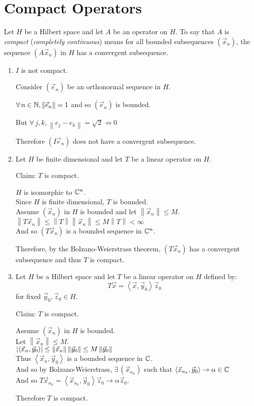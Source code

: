 \documentclass[letterpaper,12pt,fleqn]{article}
\newcommand{\ve}{\vec{e}}
\newcommand{\vx}{\vec{x}}
\newcommand{\vy}{\vec{y}}
\newcommand{\vz}{\vec{z}}
\newcommand{\norm}[1]{\left\|#1\right\|}
\newcommand{\inner}[1]{\left<#1\right>}
\renewcommand{\a}{\alpha}
\begin{document}
\section*{Compact Operators}

\begin{definition}
  Let $H$ be a Hilbert space and let $A$ be an operator on $H$. To say that
  $A$ is \emph{compact} (\emph{completely continuous}) means for all bounded
  subsequences $(\vx_n)$, the sequence $(A\vx_n)$ in $H$ has a convergent
  subsequence.
\end{definition}

\begin{examples}
  \listbreak
  \begin{enumerate}
  \item $I$ is not compact.

    Consider $(\ve_n)$ be an orthonormal sequence in $H$.

    $\forall\,n\in\N,\norm{\ve_n}=1$ and so $(\ve_n)$ is bounded.

    But $\forall\,j,k,\norm{e_j-e_k}=\sqrt{2}\not\to0$

    Therefore $(I\ve_n)$ does not have a convergent subsequence.

  \item Let $H$ be finite dimensional and let $T$ be a linear operator on $H$.

    Claim: $T$ is compact.

    $H$ is isomorphic to $\mathbb{C}^n$. \\
    Since $H$ is finite dimensional, $T$ is bounded. \\
    Assume $(\vx_n)$ in $H$ is bounded and let $\norm{\vx_n}\le M$. \\
    $\norm{T\vx_n}\le\norm{T}\norm{\vx_n}\le M\norm{T}<\infty$ \\
    And so $(T\vx_n)$ is a bounded sequence in $\mathbb{C}^n$.

    Therefore, by the Bolzano-Weierstrass theorem, $(T\vx_n)$ has a
    convergent subsequence and thus $T$ is compact.

  \item Let $H$ be a Hilbert space and let $T$ be a linear operator on $H$
    defined by:
    \[T\vx=\inner{\vx,\vy_0}\vz_0\]
    for fixed $\vy_0,\vz_0\in H$.

    Claim: $T$ is compact.

    Assume $(\vx_n)$ in $H$ is bounded. \\
    Let $\norm{\vx_n}\le M$. \\
    $\abs{\inner{\vx_n,\vy_0}}\le\norm{\vx_n}\norm{\vy_0}\le M\norm{\vy_0}$ \\
    Thus $\inner{\vx_n,\vy_0}$ is a bounded sequence in $\mathbb{C}$. \\
    And so by Bolzano-Weierstrass, $\exists\,(\vx_{n_k})$ such that
    $\inner{\vx_{n_k},\vy_0}\to\a\in\C$ \\
    And so $T\vx_{n_k}=\inner{\vx_{n_k},\vy_0}\vz_0\to\a\vz_0$.

    Therefore $T$ is compact.
  \end{enumerate}
\end{examples}
\end{document}
